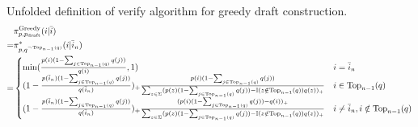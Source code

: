 \documentclass{article}
\begin{document}
Unfolded definition of verify algorithm for greedy draft construction.
\begin{equation}
\begin{aligned}
&\pi^{\operatorname{Greedy}}_{p,p_{\operatorname{draft}}}(i|\bar{i})
\\=&\pi^\ast_{p,q^{\neg \operatorname{Top}_{n-1}(q)}}(i|\bar{i}_n)
\\=&\begin{cases}
\min(\frac{p(i)(1-\sum_{j\in\operatorname{Top}_{n-1}(q)} q(j))}{q(i)},1)&i=\bar{i}_n
\\
(1-\frac{p(\bar{i}_n)(1-\sum_{j\in\operatorname{Top}_{n-1}(q)} q(j))}{q(\bar{i}_n)})_+
\frac{p(i)(1-\sum_{j\in\operatorname{Top}_{n-1}(q)} q(j))}{\sum_{z\in\Sigma} (p(z)(1-\sum_{j\in\operatorname{Top}_{n-1}(q)} q(j))-\mathbb{I}(z\notin\operatorname{Top}_{n-1}(q))q(z))_+}&i\in \operatorname{Top}_{n-1}(q)
\\
(1-\frac{p(\bar{i}_n)(1-\sum_{j\in\operatorname{Top}_{n-1}(q)} q(j))}{q(\bar{i}_n)})_+
\frac{(p(i)(1-\sum_{j\in\operatorname{Top}_{n-1}(q)} q(j))-q(i))_+}{\sum_{z\in\Sigma} (p(z)(1-\sum_{j\in\operatorname{Top}_{n-1}(q)} q(j))-\mathbb{I}(z\notin\operatorname{Top}_{n-1}(q))q(z))_+}
&i\neq\bar{i}_n, i\notin \operatorname{Top}_{n-1}(q)
\end{cases}
\end{aligned}
\end{equation}
\end{document}
